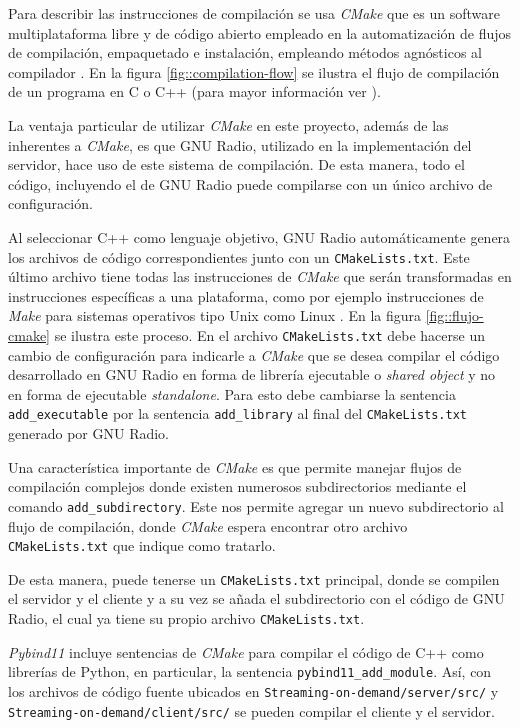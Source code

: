 \documentclass[../../main.tex]{subfiles}
\begin{document}
Para describir las instrucciones de compilación se usa \textit{CMake} que es un software multiplataforma libre y de código abierto empleado en la automatización de flujos de compilación, empaquetado e instalación, empleando métodos agnósticos al compilador \cite{CMake}. En la figura \ref{fig::compilation-flow} se ilustra el flujo de compilación de un programa en C o C++ (para mayor información ver \cite{computer-systems}).

La ventaja particular de utilizar \textit{CMake} en este proyecto, además de las inherentes a \textit{CMake}, es que GNU Radio, utilizado en la implementación del servidor, hace uso de este sistema de compilación. De esta manera, todo el código, incluyendo el de GNU Radio puede compilarse con un único archivo de configuración.

Al seleccionar C++ como lenguaje objetivo, GNU Radio automáticamente genera los archivos de código correspondientes junto con un \texttt{CMakeLists.txt}. Este último archivo tiene todas las instrucciones de \textit{CMake} que serán transformadas en instrucciones específicas a una plataforma, como por ejemplo instrucciones de \textit{Make} para sistemas operativos tipo Unix como Linux \cite{Make}. En la figura \ref{fig::flujo-cmake} se ilustra este proceso.
En el archivo \texttt{CMakeLists.txt} debe hacerse un cambio de configuración para indicarle a \textit{CMake} que se desea compilar el código desarrollado en GNU Radio en forma de librería ejecutable o \textit{shared object} y no en forma de ejecutable \textit{standalone}. Para esto debe cambiarse la sentencia \texttt{add\_executable} por la sentencia \texttt{add\_library} al final del \texttt{CMakeLists.txt} generado por GNU Radio.

Una característica importante de \textit{CMake} es que permite manejar flujos de compilación complejos donde existen numerosos subdirectorios mediante el comando \texttt{add\_subdirectory}. Este nos permite agregar un nuevo subdirectorio al flujo de compilación, donde \textit{CMake} espera encontrar otro archivo \texttt{CMakeLists.txt} que indique como tratarlo. 

De esta manera, puede tenerse un \texttt{CMakeLists.txt} principal, donde se compilen el servidor y el cliente y a su vez se añada el subdirectorio con el código de GNU Radio, el cual ya tiene su propio archivo \texttt{CMakeLists.txt}.

\textit{Pybind11} incluye sentencias de \textit{CMake} para compilar el código de C++ como librerías de Python, en particular, la sentencia \texttt{pybind11\_add\_module}. Así, con los archivos de código fuente ubicados en \texttt{Streaming-on-demand/server/src/} y \texttt{Streaming-on-demand/client/src/} se pueden compilar el cliente y el servidor.
\end{document}
